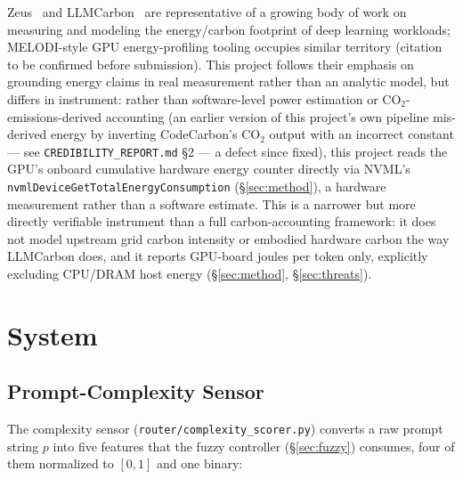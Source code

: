 \documentclass[conference]{IEEEtran}
\begin{document}
Zeus~\cite{zeus} and LLMCarbon~\cite{llmcarbon} are representative of a
growing body of work on measuring and modeling the energy/carbon
footprint of deep learning workloads; MELODI-style GPU energy-profiling
tooling occupies similar territory (citation to be confirmed before
submission). This project follows their emphasis on grounding energy
claims in real measurement rather than an analytic model, but differs in
instrument: rather than software-level power estimation or
CO$_2$-emissions-derived accounting (an earlier version of this
project's own pipeline mis-derived energy by inverting CodeCarbon's
CO$_2$ output with an incorrect constant --- see
\texttt{CREDIBILITY\_REPORT.md} \S 2 --- a defect since fixed), this
project reads the GPU's onboard cumulative hardware energy counter
directly via NVML's \texttt{nvmlDeviceGetTotalEnergyConsumption}
(\S\ref{sec:method}), a hardware measurement rather than a software
estimate. This is a narrower but more directly verifiable instrument than
a full carbon-accounting framework: it does not model upstream grid
carbon intensity or embodied hardware carbon the way LLMCarbon does, and
it reports GPU-board joules per token only, explicitly excluding CPU/DRAM
host energy (\S\ref{sec:method}, \S\ref{sec:threats}).

\section{System}
\label{sec:system}

\subsection{Prompt-Complexity Sensor}
\label{sec:sensor}

The complexity sensor (\texttt{router/complexity\_scorer.py}) converts a
raw prompt string $p$ into five features that the fuzzy controller
(\S\ref{sec:fuzzy}) consumes, four of them normalized to $[0,1]$ and one
binary:
\end{document}

